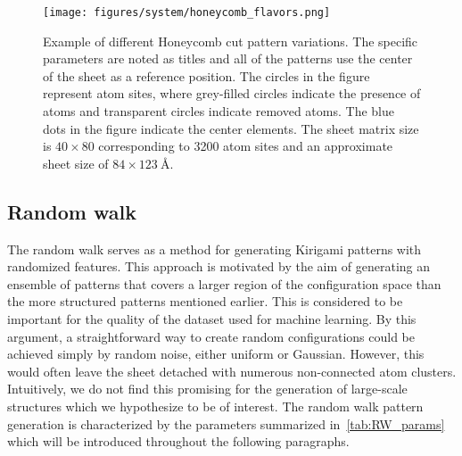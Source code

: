 \begin{figure}[H]
  \centering
  \texttt{[image: figures/system/honeycomb\_flavors.png]}
  \caption{Example of different Honeycomb cut pattern variations. The specific parameters are noted as titles and all of the patterns use the center of the sheet as a reference position. The circles in the figure represent atom sites, where grey-filled circles indicate the presence of atoms and transparent circles indicate removed atoms. The blue dots in the figure indicate the center elements. 
  The sheet matrix size is $40 \times 80$ corresponding to 3200 atom sites and an approximate sheet size of $84 \times \SI{123}{\text{Å}}$.}
  \label{fig:honeycomb_flavors}
\end{figure}



\subsection{Random walk}
The random walk serves as a method for generating Kirigami patterns with randomized features. This approach is motivated by the aim of generating an ensemble of patterns that covers a larger region of the configuration space than the more structured patterns mentioned earlier. This is considered to be important for the quality of the dataset used for machine learning. By this argument, a straightforward way to create random configurations could be achieved simply by random noise, either uniform or Gaussian. However, this would often leave the sheet detached with numerous non-connected atom clusters. Intuitively, we do not find this promising for the generation of large-scale structures which we hypothesize to be of interest. The random walk pattern generation is characterized by the parameters summarized in~\cref{tab:RW_params} which will be introduced throughout the following paragraphs. 


